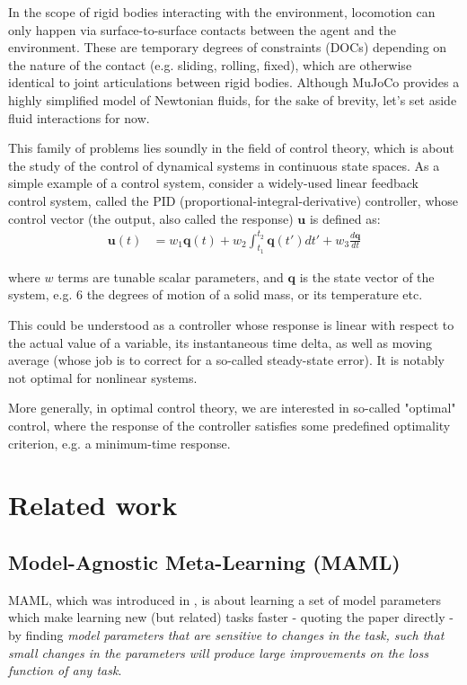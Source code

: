 \documentclass{article}
\newcommand{\bvec}[1]{\boldsymbol{#1}}
\begin{document}
In the scope of rigid bodies interacting with the environment, locomotion can only happen via surface-to-surface contacts between the agent and the environment. These are temporary degrees of constraints (DOCs) depending on the nature of the contact (e.g. sliding, rolling, fixed), which are otherwise identical to joint articulations between rigid bodies. Although MuJoCo provides a highly simplified model of Newtonian fluids, for the sake of brevity, let's set aside fluid interactions for now.

This family of problems lies soundly in the field of control theory, which is about the study of the control of dynamical systems in continuous state spaces. As a simple example of a control system, consider a widely-used linear feedback control system, called the PID (proportional-integral-derivative) controller, whose control vector (the output, also called the response) $\bvec{u}$ is defined as:
\begin{align*}
\bvec{u}(t) &= w_1 \bvec{q}(t) + w_2\int_{t_1}^{t_2} \bvec{q}(t') dt' + w_3 \frac{d\bvec{q}}{dt}
\end{align*}

where $w$ terms are tunable scalar parameters, and $\bvec{q}$ is the state vector of the system, e.g. 6 the degrees of motion of a solid mass, or its temperature etc.

This could be understood as a controller whose response is linear with respect to the actual value of a variable, its instantaneous time delta, as well as moving average (whose job is to correct for a so-called steady-state error). It is notably not optimal for nonlinear systems.

More generally, in optimal control theory, we are interested in so-called "optimal" control, where the response of the controller satisfies some predefined optimality criterion, e.g. a minimum-time response.

\section{Related work}

\subsection{Model-Agnostic Meta-Learning (MAML)}
MAML, which was introduced in \cite{finn2017model}, is about learning a set of model parameters which make learning new (but related) tasks faster - quoting the paper directly - by finding \textit{model parameters that are sensitive to changes in the task, such that small changes in the parameters will produce large improvements on the loss function of any task}.
\end{document}
